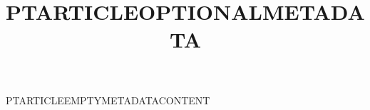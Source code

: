 \documentclass[nominted]{pt-article}
\title{PTARTICLEOPTIONALMETADATA}
\begin{document}
\noindent PTARTICLEEMPTYMETADATACONTENT
\end{document}
